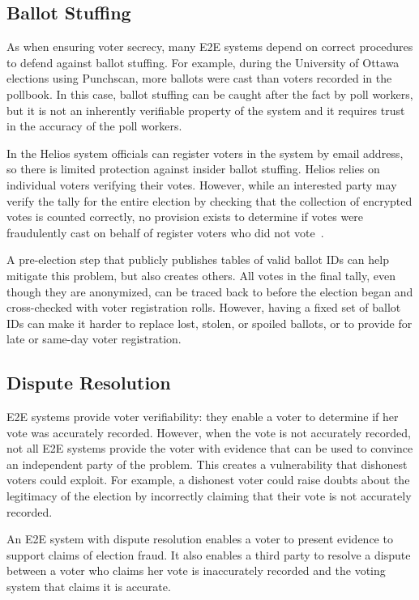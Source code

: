 \subsection{Ballot Stuffing}

As when ensuring voter secrecy, many E2E systems depend on correct
procedures to defend against ballot stuffing. For example, during the
University of Ottawa elections using Punchscan, more ballots were cast
than voters recorded in the pollbook. In this case, ballot stuffing
can be caught after the fact by poll workers, but it is not an
inherently verifiable property of the system and it requires trust in
the accuracy of the poll workers.

In the Helios system officials can register voters in the system by
email address, so there is limited protection against insider ballot
stuffing. Helios relies on individual voters verifying their
votes. However, while an interested party may verify the tally for the
entire election by checking that the collection of encrypted votes is
counted correctly, no provision exists to determine if votes were
fraudulently cast on behalf of register voters who did not
vote~\cite{orion2009}.

A pre-election step that publicly publishes tables of valid ballot IDs
can help mitigate this problem, but also creates others. All votes in
the final tally, even though they are anonymized, can be traced back
to before the election began and cross-checked with voter registration
rolls. However, having a fixed set of ballot IDs can make it harder to
replace lost, stolen, or spoiled ballots, or to provide for late or
same-day voter registration.

\subsection{Dispute Resolution}

E2E systems provide voter verifiability: they enable a voter to
determine if her vote was accurately recorded. However, when the vote
is not accurately recorded, not all E2E systems provide the voter with
evidence that can be used to convince an independent party of the
problem. This creates a vulnerability that dishonest voters could
exploit. For example, a dishonest voter could raise doubts about the
legitimacy of the election by incorrectly claiming that their vote is
not accurately recorded.

An E2E system with dispute resolution enables a voter to present
evidence to support claims of election fraud. It also enables a third
party to resolve a dispute between a voter who claims her vote is
inaccurately recorded and the voting system that claims it is accurate.

